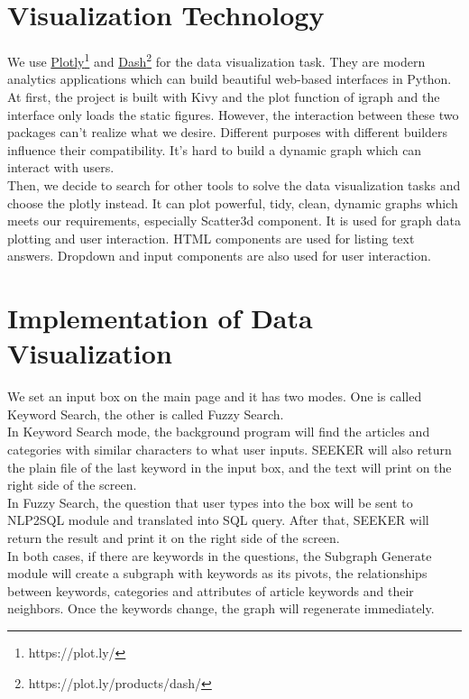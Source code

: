 \section{Visualization Technology}
\vspace{-5pt}
We use \href{https://plot.ly/}{Plotly}\footnote{https://plot.ly/} and \href{https://plot.ly/products/dash/}{Dash}\footnote{https://plot.ly/products/dash/} for the data visualization task. They are modern analytics applications which can build beautiful web-based interfaces in Python. \\
\indent At first, the project is built with Kivy and the plot function of igraph and the interface only loads the static figures. However, the interaction between these two packages can't realize what we desire. Different purposes with different builders influence their compatibility. It's hard to build a dynamic graph which can interact with users.\\ 
\indent Then, we decide to search for other tools to solve the data visualization tasks and choose the plotly instead. It can plot powerful, tidy, clean, dynamic graphs which meets our requirements, especially Scatter3d component. It is used for graph data plotting and user interaction. HTML components are used for listing text answers. Dropdown and input components are also used for user interaction.

\section{Implementation of Data Visualization}
\vspace{-5pt}
We set an input box on the main page and it has two modes. One is called Keyword Search, the other is called Fuzzy Search.\\
\indent In Keyword Search mode, the background program will find the articles and categories with similar characters to what user inputs. SEEKER will also return the plain file of the last keyword in the input box, and the text will print on the right side of the screen.\\
\indent In Fuzzy Search, the question that user types into the box will be sent to NLP2SQL module and translated into SQL query. After that, SEEKER will return the result and print it on the right side of the screen.\\
\indent In both cases, if there are keywords in the questions, the Subgraph Generate module will create a subgraph with keywords as its pivots, the relationships between keywords, categories and attributes of article keywords and their neighbors. Once the keywords change, the graph will regenerate immediately. 
